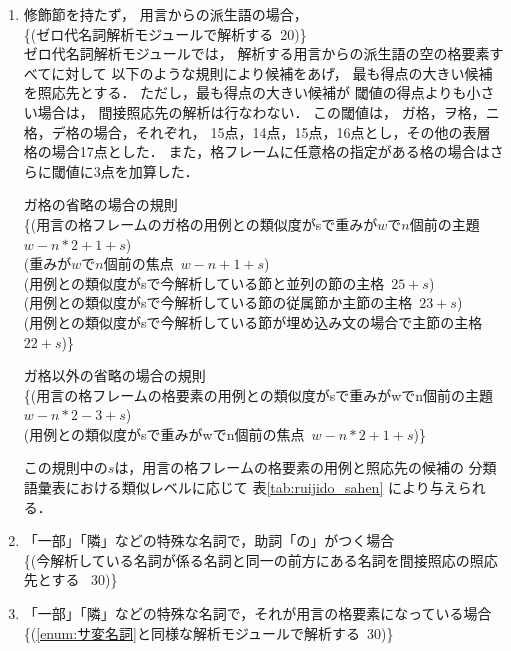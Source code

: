 {\begin{enumerate}
\item 
  \label{enum:サ変名詞}
  修飾節を持たず，
  用言からの派生語の場合，\\
  \{(ゼロ代名詞解析モジュール\cite{murata_deno_nl95}で解析する \,20)\}\\
  ゼロ代名詞解析モジュールでは，
  解析する用言からの派生語の空の格要素すべてに対して
  以下のような規則により候補をあげ，
  最も得点の大きい候補を照応先とする．
  ただし，最も得点の大きい候補が
  閾値の得点よりも小さい場合は，
  間接照応先の解析は行なわない．
  この閾値は，
  ガ格，ヲ格，ニ格，デ格の場合，それぞれ，
  15点，14点，15点，16点とし，その他の表層格の場合17点とした．
  また，格フレームに任意格の指定がある格の場合はさらに閾値に3点を加算した．

\begin{indention}{0.8cm}\noindent
  ガ格の省略の場合の規則\\
  \{(用言の格フレームのガ格の用例との類似度がsで重みが$w$で$n$個前の主題 \,$w-n*2+1+s$)\\
  (重みが$w$で$n$個前の焦点 \,$w-n+1+s$)\\
  (用例との類似度がsで今解析している節と並列の節の主格 \,$25+s$)\\
  (用例との類似度がsで今解析している節の従属節か主節の主格 \,$23+s$)\\
  (用例との類似度がsで今解析している節が埋め込み文の場合で主節の主格 \,$22+s$)\}
\end{indention}
\begin{indention}{0.8cm}\noindent
  ガ格以外の省略の場合の規則\\
  \{(用言の格フレームの格要素の用例との類似度がsで重みがwでn個前の主題 \,$w-n*2-3+s$)\\
  (用例との類似度がsで重みがwでn個前の焦点 \,$w-n*2+1+s$)\}
\end{indention}

この規則中の$s$は，用言の格フレームの格要素の用例と照応先の候補の
分類語彙表における類似レベルに応じて
表\ref{tab:ruijido_sahen} により与えられる．

\item 
  「一部」「隣」などの特殊な名詞で，助詞「の」がつく場合\\
  \{(今解析している名詞が係る名詞と同一の前方にある名詞を間接照応の照応先とする
  \, $30$)\}

\item 
  \label{enum:itibu_case}
  「一部」「隣」などの特殊な名詞で，それが用言の格要素になっている場合\\
  \{(\ref{enum:サ変名詞}と同様な解析モジュールで解析する \,30)\}

\end{enumerate}
}

